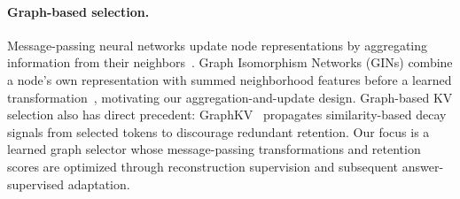 \paragraph{Graph-based selection.}
Message-passing neural networks update node representations by aggregating information from their neighbors~\citep{gilmer2017mpnn}. Graph Isomorphism Networks (GINs) combine a node's own representation with summed neighborhood features before a learned transformation~\citep{xu2019gin}, motivating our aggregation-and-update design. Graph-based KV selection also has direct precedent: GraphKV~\citep{li2025graphkv} propagates similarity-based decay signals from selected tokens to discourage redundant retention. Our focus is a learned graph selector whose message-passing transformations and retention scores are optimized through reconstruction supervision and subsequent answer-supervised adaptation.
